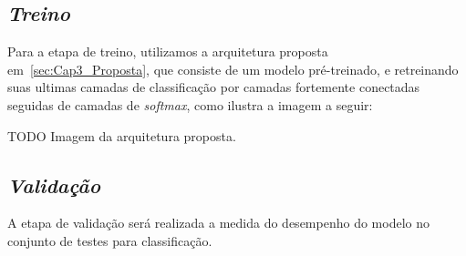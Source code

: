 \subsection{\textit{Treino}}\label{sec:Cap3_Treino}
Para a etapa de treino, utilizamos a arquitetura proposta em~\ref{sec:Cap3_Proposta}, que consiste de um modelo pré-treinado, e retreinando suas ultimas camadas de classificação por camadas fortemente conectadas seguidas de camadas de \textit{softmax}, como ilustra a imagem a seguir:


TODO Imagem da arquitetura proposta.



\subsection{\textit{Validação}}\label{sec:Cap3_Validacao}

A etapa de validação será realizada a medida do desempenho do modelo no conjunto de testes para classificação.








